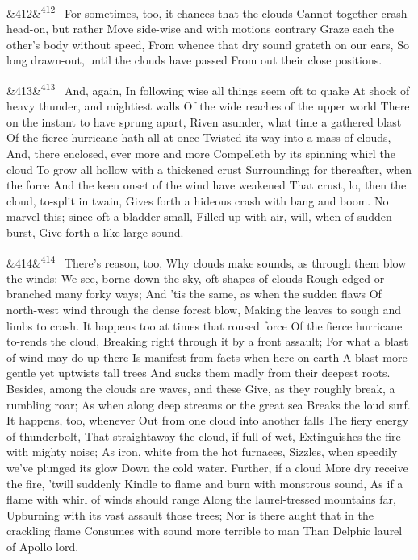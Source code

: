 \documentclass[12pt]{article}
\newcommand{\para}[1][]{\par\noindent\ifx&#1&\else\textsuperscript{\footnotesize #1}~\fi}
\begin{document}
\para[412] For sometimes, too, it chances that the clouds Cannot together crash head-on, but rather Move side-wise and with motions contrary Graze each the other's body without speed, From whence that dry sound grateth on our ears, So long drawn-out, until the clouds have passed From out their close positions.

\para[413] And, again, In following wise all things seem oft to quake At shock of heavy thunder, and mightiest walls Of the wide reaches of the upper world There on the instant to have sprung apart, Riven asunder, what time a gathered blast Of the fierce hurricane hath all at once Twisted its way into a mass of clouds, And, there enclosed, ever more and more Compelleth by its spinning whirl the cloud To grow all hollow with a thickened crust Surrounding; for thereafter, when the force And the keen onset of the wind have weakened That crust, lo, then the cloud, to-split in twain, Gives forth a hideous crash with bang and boom. No marvel this; since oft a bladder small, Filled up with air, will, when of sudden burst, Give forth a like large sound.

\para[414] There's reason, too, Why clouds make sounds, as through them blow the winds: We see, borne down the sky, oft shapes of clouds Rough-edged or branched many forky ways; And 'tis the same, as when the sudden flaws Of north-west wind through the dense forest blow, Making the leaves to sough and limbs to crash. It happens too at times that roused force Of the fierce hurricane to-rends the cloud, Breaking right through it by a front assault; For what a blast of wind may do up there Is manifest from facts when here on earth A blast more gentle yet uptwists tall trees And sucks them madly from their deepest roots. Besides, among the clouds are waves, and these Give, as they roughly break, a rumbling roar; As when along deep streams or the great sea Breaks the loud surf. It happens, too, whenever Out from one cloud into another falls The fiery energy of thunderbolt, That straightaway the cloud, if full of wet, Extinguishes the fire with mighty noise; As iron, white from the hot furnaces, Sizzles, when speedily we've plunged its glow Down the cold water. Further, if a cloud More dry receive the fire, 'twill suddenly Kindle to flame and burn with monstrous sound, As if a flame with whirl of winds should range Along the laurel-tressed mountains far, Upburning with its vast assault those trees; Nor is there aught that in the crackling flame Consumes with sound more terrible to man Than Delphic laurel of Apollo lord.
\end{document}
